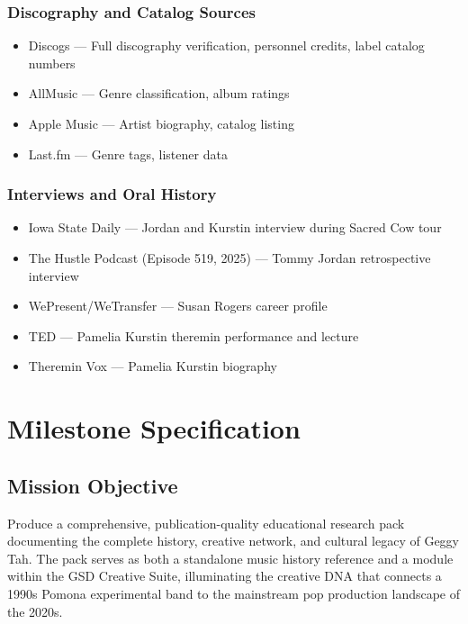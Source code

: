 \documentclass[11pt,letterpaper]{article}
\newcommand{\stageheader}[2]{%
  \noindent\colorbox{#2}{\makebox[\textwidth][l]{%
    \textcolor{white}{\bfseries\sffamily\hspace{6pt}#1\hspace{6pt}}}}%
  \vspace{0.5em}\par%
}
\begin{document}
\subsubsection{Discography and Catalog Sources}
\begin{itemize}[leftmargin=2em]
\item Discogs --- Full discography verification, personnel credits, label catalog numbers
\item AllMusic --- Genre classification, album ratings
\item Apple Music --- Artist biography, catalog listing
\item Last.fm --- Genre tags, listener data
\end{itemize}

\subsubsection{Interviews and Oral History}
\begin{itemize}[leftmargin=2em]
\item Iowa State Daily --- Jordan and Kurstin interview during Sacred Cow tour
\item The Hustle Podcast (Episode 519, 2025) --- Tommy Jordan retrospective interview
\item WePresent/WeTransfer --- Susan Rogers career profile
\item TED --- Pamelia Kurstin theremin performance and lecture
\item Theremin Vox --- Pamelia Kurstin biography
\end{itemize}

\newpage
\stageheader{STAGE 3 --- MISSION PACKAGE}{tertiary}

\section{Milestone Specification}

\subsection{Mission Objective}

Produce a comprehensive, publication-quality educational research pack documenting the complete history, creative network, and cultural legacy of Geggy Tah. The pack serves as both a standalone music history reference and a module within the GSD Creative Suite, illuminating the creative DNA that connects a 1990s Pomona experimental band to the mainstream pop production landscape of the 2020s.
\end{document}
